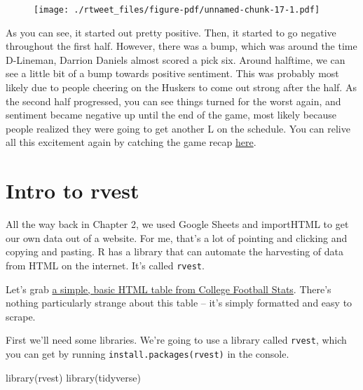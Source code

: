 \documentclass[
  letterpaper,
  DIV=11,
  numbers=noendperiod]{scrreprt}
\newenvironment{Shaded}{\begin{snugshade}}{\end{snugshade}}
\newcommand{\FunctionTok}[1]{\textcolor[rgb]{0.28,0.35,0.67}{#1}}
\newcommand{\NormalTok}[1]{\textcolor[rgb]{0.00,0.23,0.31}{#1}}
\begin{document}
\begin{figure}[H]

{\centering \texttt{[image: ./rtweet\_files/figure-pdf/unnamed-chunk-17-1.pdf]}

}

\end{figure}

As you can see, it started out pretty positive. Then, it started to go
negative throughout the first half. However, there was a bump, which was
around the time D-Lineman, Darrion Daniels almost scored a pick six.
Around halftime, we can see a little bit of a bump towards positive
sentiment. This was probably most likely due to people cheering on the
Huskers to come out strong after the half. As the second half
progressed, you can see things turned for the worst again, and sentiment
became negative up until the end of the game, most likely because people
realized they were going to get another L on the schedule. You can
relive all this excitement again by catching the game recap
\href{https://www.youtube.com/watch?v=m0hKH6Zb0vY\&feature=onebox}{here}.


\hypertarget{intro-to-rvest}{%
\chapter{Intro to rvest}\label{intro-to-rvest}}

All the way back in Chapter 2, we used Google Sheets and importHTML to
get our own data out of a website. For me, that's a lot of pointing and
clicking and copying and pasting. R has a library that can automate the
harvesting of data from HTML on the internet. It's called
\texttt{rvest}.

Let's grab
\href{http://www.cfbstats.com/2021/leader/national/team/offense/split01/category09/sort01.html}{a
simple, basic HTML table from College Football Stats}. There's nothing
particularly strange about this table -- it's simply formatted and easy
to scrape.

First we'll need some libraries. We're going to use a library called
\texttt{rvest}, which you can get by running
\texttt{install.packages(\textquotesingle{}rvest\textquotesingle{})} in
the console.

\begin{Shaded}
\begin{Highlighting}[]
\FunctionTok{library}\NormalTok{(rvest)}
\FunctionTok{library}\NormalTok{(tidyverse)}
\end{Highlighting}
\end{Shaded}
\end{document}
